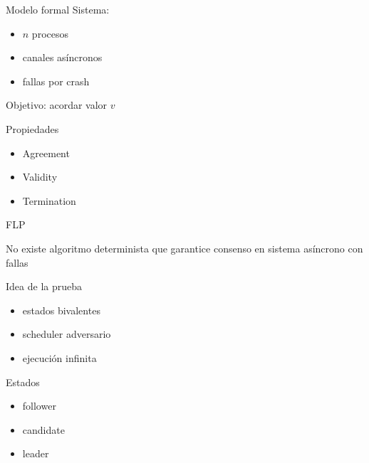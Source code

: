 \documentclass[institutional,screen,none]{ua-engineering-v6-beamer}
\title{\UACourse}
\subtitle{Clase 04 --- Consenso (Raft, Paxos, FLP)}
\author{\UAProfessor}
\date{\UADate}
\begin{document}
{
\begin{frame}[plain]
\titlepage
\end{frame}
}


\begin{frame}{Modelo formal}
Sistema:
\begin{itemize}
\item $n$ procesos
\item canales asíncronos
\item fallas por crash
\end{itemize}

\pause

Objetivo: acordar valor $v$
\end{frame}

\begin{frame}{Propiedades}
\begin{itemize}
\item Agreement
\item Validity
\item Termination
\end{itemize}
\end{frame}


\begin{frame}{FLP}
\begin{block}{}
No existe algoritmo determinista que garantice consenso en sistema asíncrono con fallas
\end{block}
\end{frame}

\begin{frame}{Idea de la prueba}
\begin{itemize}
\item estados bivalentes
\item scheduler adversario
\item ejecución infinita
\end{itemize}
\end{frame}


\begin{frame}{Estados}
\begin{itemize}
\item follower
\item candidate
\item leader
\end{itemize}
\end{frame}
\end{document}

